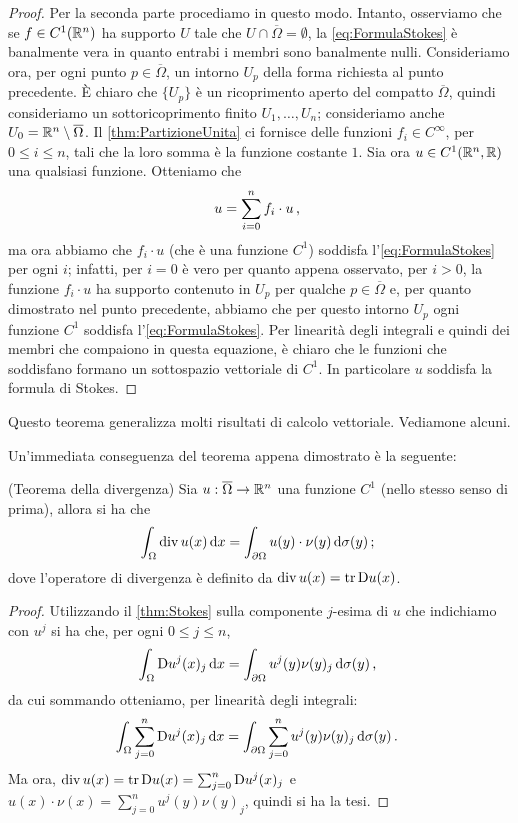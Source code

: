 \begin{proof}
	Per la seconda parte procediamo in questo modo. Intanto, osserviamo che se $f\in C^1(\mathbb R^n)$ ha supporto $U$ tale che $U\cap \overline\Omega =
	\emptyset$, la \cref{eq:FormulaStokes} è banalmente vera in quanto entrabi i membri sono banalmente nulli.
	Consideriamo ora, per ogni punto $p\in \overline\Omega$, un intorno $U_p$ della forma richiesta al punto precedente. È chiaro che $\{U_p\}$ è un
	ricoprimento aperto del compatto $\overline\Omega$, quindi consideriamo un sottoricoprimento finito $U_1,\dots,U_n$; consideriamo anche
	$U_0=\mathbb R^n \setminus \overline\Omega$. Il \cref{thm:PartizioneUnita} ci fornisce delle funzioni $f_i\in C^{\infty}$, per $0\leq i \leq n$,
	tali che la loro somma è la funzione costante $1$.
	Sia ora $u\in C^1(\mathbb R^n,\mathbb R)$ una qualsiasi funzione. Otteniamo che
	\[
		u = \sum_{i=0}^n f_i\cdot u\, \text{, }
	\]
	ma ora abbiamo che $f_i \cdot u$ (che è una funzione $C^1$) soddisfa l'\cref{eq:FormulaStokes} per ogni $i$; infatti, per $i=0$ è vero
	per quanto appena osservato, per $i>0$, la funzione $f_i \cdot u$ ha supporto contenuto in $U_p$ per qualche $p\in \overline\Omega$ e, per quanto
	dimostrato nel punto precedente, abbiamo che per questo intorno $U_p$ ogni funzione $C^1$ soddisfa l'\cref{eq:FormulaStokes}.
	Per linearità degli integrali e quindi dei membri che compaiono in questa equazione, è chiaro che le funzioni che soddisfano formano
	un sottospazio vettoriale di $C^1$. In particolare $u$ soddisfa la formula di Stokes.
\end{proof}

Questo teorema generalizza molti risultati di calcolo vettoriale. Vediamone alcuni.

Un'immediata conseguenza del teorema appena dimostrato è la seguente:

\begin{corollary}(Teorema della divergenza)
	\label{cor:thDivergenza}
	Sia $u:\overline\Omega \rightarrow \mathbb R^n$ una funzione $C^1$ (nello stesso senso di prima), allora si ha che
	\begin{equation}\label{eq:thDivergenza}
		\int_{\Omega} \operatorname{div} u (x) \,\mathrm d x = \int_{\partial \Omega} u(y)\cdot\nu(y) \,\mathrm d \sigma(y)\, \text{; }
	\end{equation}
	dove l'operatore di divergenza è definito da $\operatorname{div} u(x)=\operatorname{tr}\mathrm D u(x)$.
\end{corollary}

\begin{proof}
	Utilizzando il \cref{thm:Stokes} sulla componente $j$-esima di $u$ che indichiamo con $u^j$ si ha che, per ogni $0\leq j\leq n$,
	\[
		\int_{\Omega} \mathrm D u^j(x)_j \,\mathrm d x = \int_{\partial \Omega} u^j(y)\nu(y)_j \,\mathrm d \sigma(y)\, \text{, }
	\]
	da cui sommando otteniamo, per linearità degli integrali:
	\[
		\int_{\Omega} \sum_{j=0}^n\mathrm D u^j(x)_j \,\mathrm d x = \int_{\partial \Omega} \sum_{j=0}^n u^j(y)\nu(y)_j \,\mathrm d \sigma(y)\, \text{. }
	\]
	Ma ora, $\operatorname{div} u (x)= \operatorname{tr}\mathrm D u(x) = \sum_{j=0}^n \mathrm D u^j(x)_j$ e $u(x)\cdot\nu(x)=\sum_{j=0}^n u^j(y)\nu(y)_j$,
	quindi si ha la tesi.
\end{proof}

